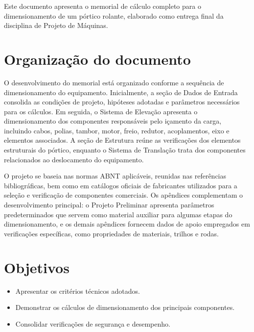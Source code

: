 Este documento apresenta o memorial de cálculo completo para o dimensionamento de um pórtico rolante, elaborado como entrega final da disciplina de Projeto de Máquinas.

\section{Organização do documento}

O desenvolvimento do memorial está organizado conforme a sequência de dimensionamento do equipamento. Inicialmente, a seção de Dados de Entrada consolida as condições de projeto, hipóteses adotadas e parâmetros necessários para os cálculos. Em seguida, o Sistema de Elevação apresenta o dimensionamento dos componentes responsáveis pelo içamento da carga, incluindo cabos, polias, tambor, motor, freio, redutor, acoplamentos, eixo e elementos associados. A seção de Estrutura reúne as verificações dos elementos estruturais do pórtico, enquanto o Sistema de Translação trata dos componentes relacionados ao deslocamento do equipamento.

O projeto se baseia nas normas ABNT aplicáveis, reunidas nas referências bibliográficas, bem como em catálogos oficiais de fabricantes utilizados para a seleção e verificação de componentes comerciais. Os apêndices complementam o desenvolvimento principal: o Projeto Preliminar apresenta parâmetros predeterminados que servem como material auxiliar para algumas etapas do dimensionamento, e os demais apêndices fornecem dados de apoio empregados em verificações específicas, como propriedades de materiais, trilhos e rodas.

\section{Objetivos}
\begin{itemize}[leftmargin=1.25cm]
  \item Apresentar os critérios técnicos adotados.
  \item Demonstrar os cálculos de dimensionamento dos principais componentes.
  \item Consolidar verificações de segurança e desempenho.
\end{itemize}
